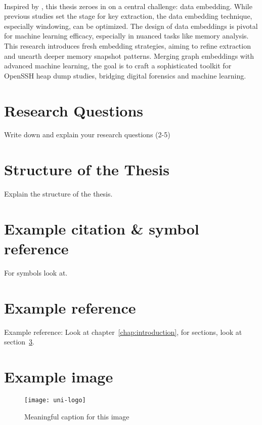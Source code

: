 \paragraph*{}Inspired by , this thesis zeroes in on a central challenge: data embedding. While previous studies set the stage for key extraction, the data embedding technique, especially windowing, can be optimized. The design of data embeddings is pivotal for machine learning efficacy, especially in nuanced tasks like memory analysis. This research introduces fresh embedding strategies, aiming to refine extraction and unearth deeper memory snapshot patterns. Merging graph embeddings with advanced machine learning, the goal is to craft a sophisticated toolkit for OpenSSH heap dump studies, bridging digital forensics and machine learning.


\section{Research Questions}

Write down and explain your research questions (2-5)

\section{Structure of the Thesis}

Explain the structure of the thesis. 

\section{Example citation \& symbol reference}\label{sec:citation}
For symbols look at.


\section{Example reference}
Example reference: Look at chapter~\ref{chap:introduction}, for sections, look at section~\ref{sec:citation}.

\section{Example image}

\begin{figure}
	\centering
	\texttt{[image: uni-logo]}
	\caption{Meaningful caption for this image}
	\label{fig:uniLogo}
\end{figure}

